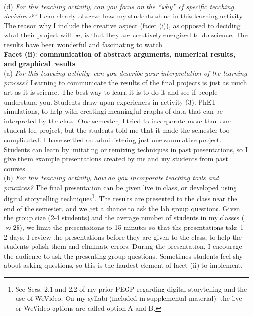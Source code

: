 \documentclass[../../../main.tex]{subfiles}
\begin{document}
\\
\vspace{0.25cm}
(d) \textit{For this teaching activity, can you focus on the ``why'' of specific teaching decisions?''}  I can clearly observe how my students shine in this learning activity.  The reason why I include the creative aspect (facet (i)), as opposed to deciding what their project will be, is that they are creatively energized to do science.  The results have been wonderful and fascinating to watch.
\\
\vspace{0.25cm}
\textbf{Facet (ii): communication of abstract arguments, numerical results, and graphical results}
\\
\vspace{0.25cm}
(a) \textit{For this teaching activity, can you describe your interpretation of the learning process?}  Learning to communicate the results of the final projects is just as much art as it is science.  The best way to learn it is to do it and see if people understand you.  Students draw upon experiences in activity (3), PhET simulations, to help with creatingi meaningful graphs of data that can be interpreted by the class.  One semester, I tried to incorporate more than one student-led project, but the students told me that it made the semester too complicated.  I have settled on administering just one summative project.  Students can learn by imitating or remixing techniques in past presentations, so I give them example presentations created by me and my students from past courses.
\\
\vspace{0.25cm}
(b) \textit{For this teaching activity, how do you incorporate teaching tools and practices?}  The final presentation can be given live in class, or developed using digital storytelling techniques\footnote{See Secs. 2.1 and 2.2 of my prior PEGP regarding digital storytelling and the use of WeVideo.  On my syllabi (included in supplemental material), the live or WeVideo options are called option A and B.}.  The results are presented to the class near the end of the semester, and we get a chance to ask the lab group questions.  Given the group size (2-4 students) and the average number of students in my classes ($\approx 25$), we limit the presentations to 15 minutes so that the presentations take 1-2 days.  I review the presentations before they are given to the class, to help the students polish them and eliminate errors.  During the presentation, I encourage the audience to ask the presenting group questions.  Sometimes students feel shy about asking questions, so this is the hardest element of facet (ii) to implement.
\end{document}
